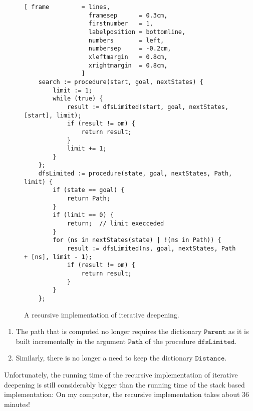 \begin{figure}[!ht]
\centering
\begin{Verbatim}[ frame         = lines, 
                  framesep      = 0.3cm, 
                  firstnumber   = 1,
                  labelposition = bottomline,
                  numbers       = left,
                  numbersep     = -0.2cm,
                  xleftmargin   = 0.8cm,
                  xrightmargin  = 0.8cm,
                ]
    search := procedure(start, goal, nextStates) {
        limit := 1;  
        while (true) {
            result := dfsLimited(start, goal, nextStates, [start], limit);
            if (result != om) {
                return result;
            }
            limit += 1;
        }
    };
    dfsLimited := procedure(state, goal, nextStates, Path, limit) {
        if (state == goal) {
            return Path;
        }
        if (limit == 0) {
            return;  // limit execceded
        }
        for (ns in nextStates(state) | !(ns in Path)) {
            result := dfsLimited(ns, goal, nextStates, Path + [ns], limit - 1);
            if (result != om) {
                return result;
            }   
        }
    };
\end{Verbatim}
\vspace*{-0.3cm}
\caption{A recursive implementation of iterative deepening.}
\label{fig:iterative-deepening-recursive.stlx}
\end{figure}
\begin{enumerate}
\item The path that is computed no longer requires the dictionary $\mathtt{Parent}$ as it is built
      incrementally in the argument $\mathtt{Path}$ of the procedure $\mathtt{dfsLimited}$.
\item Similarly, there is no longer a need to keep the dictionary $\mathtt{Distance}$.
\end{enumerate}
Unfortunately, the running time of the recursive implementation of iterative deepening is still considerably
bigger than the running time of the stack based implementation:  On my computer, the recursive implementation
takes about 36 minutes!


